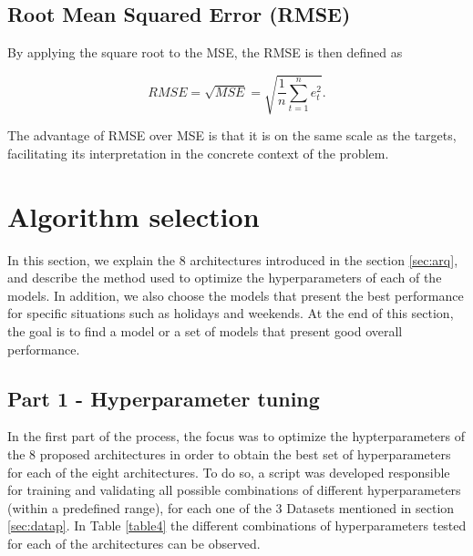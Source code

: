 \subsection{Root Mean Squared Error (RMSE)}

By applying the square root to the \ac{MSE}, the \ac{RMSE} is then defined as

\begin{equation}
     RMSE =\sqrt{MSE} = \sqrt{\frac {1}{n}\sum_{t=1}^ne_t^2}.
\label{rmse}
\end{equation}

The advantage of \ac{RMSE} over \ac{MSE} is that it is on the same scale as the targets, facilitating its interpretation in the concrete context of the problem. 

\section{Algorithm selection} \label{chap5:framework}

In this section, we explain the 8 architectures introduced in the section \ref{sec:arq}, and describe the method used to optimize the hyperparameters of each of the models. In addition, we also choose the models that present the best performance for specific situations such as holidays and weekends. At the end of this section, the goal is to find a model or a set of models that present good overall performance.


\subsection{Part 1 - Hyperparameter tuning}\label{sec:part1}
In the first part of the process, the focus was to optimize the hypterparameters of the 8 proposed architectures in order to obtain the best set of hyperparameters for each of the eight architectures. To do so, a script was developed responsible for training and validating all possible combinations of different hyperparameters (within a predefined range), for each one of the 3 Datasets mentioned in section \ref{sec:datap}. In Table \ref{table4} the different combinations of hyperparameters tested for each of the architectures can be observed.

